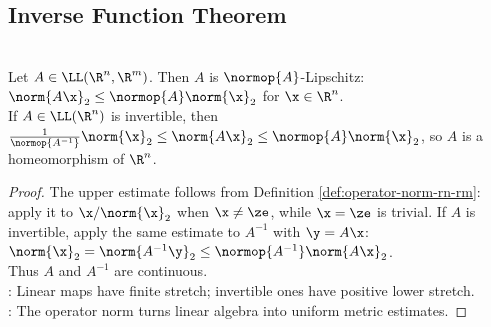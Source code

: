 \subsection{Inverse Function Theorem}

%

\begin{theorem} \label{thm:finite-dimensional-linear-maps-lipschitz-homeomorphisms} \\
Let $A\in\LL(\R^n,\R^m)$. Then $A$ is $\normop{A}$-Lipschitz: $\norm{A\x}_2\leq\normop{A}\norm{\x}_2$ for $\x\in\R^n$.\\
If $A\in\LL(\R^n)$ is invertible, then $\frac{1}{\normop{A^{-1}}}\norm{\x}_2\leq\norm{A\x}_2\leq\normop{A}\norm{\x}_2$, so $A$ is a homeomorphism of $\R^n$.
\begin{proof}
The upper estimate follows from Definition \ref{def:operator-norm-rn-rm}: apply it to $\x/\norm{\x}_2$ when $\x\neq\ze$, while $\x=\ze$ is trivial. If $A$ is invertible, apply the same estimate to $A^{-1}$ with $\y=A\x$: $\norm{\x}_2=\norm{A^{-1}\y}_2\leq\normop{A^{-1}}\norm{A\x}_2$.\\
Thus $A$ and $A^{-1}$ are continuous.\\
: Linear maps have finite stretch; invertible ones have positive lower stretch.\\
: The operator norm turns linear algebra into uniform metric estimates.
\end{proof}
\end{theorem}

